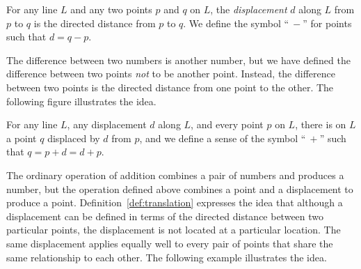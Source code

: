 \begin{definition}
   For any line $L$ and any two points $p$ and $q$ on $L$, the
   \emph{displacement} $d$ along $L$ from $p$ to $q$ is the directed distance
   from $p$ to $q$. We define the symbol ``$\:-$'' for points such that $d = q
   - p$.
\end{definition}

\noindent The difference between two numbers is another number, but we have
defined the difference between two points \emph{not} to be another point.
Instead, the difference between two points is the directed distance from one
point to the other. The following figure illustrates the idea.

\begin{center}
\end{center}

\begin{definition}
   For any line $L$, any displacement $d$ along $L$, and every point $p$ on
   $L$, there is on $L$ a point $q$ displaced by $d$ from $p$, and we define a
   sense of the symbol ``$\:+$'' such that $q = p + d = d + p$.
\label{def:translation}
\end{definition}

\noindent The ordinary operation of addition combines a pair of numbers and
produces a number, but the operation defined above combines a point and a
displacement to produce a point.  Definition~\ref{def:translation} expresses
the idea that although a displacement can be defined in terms of the directed
distance between two particular points, the displacement is not located at a
particular location. The same displacement applies equally well to every pair
of points that share the same relationship to each other. The following example
illustrates the idea.

\begin{center}
\end{center}

